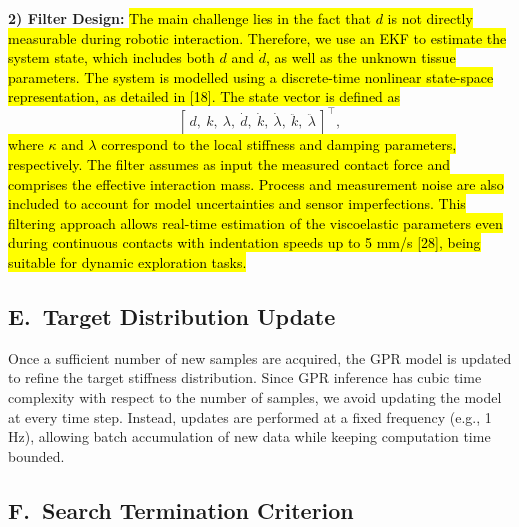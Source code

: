 \documentclass[11pt]{article}
\begin{document}
\textbf{2) Filter Design:} \hl{The main challenge lies in the fact that
$d$ is not directly measurable during robotic interaction. Therefore,
we use an EKF to estimate the system state, which includes both $d$
and $\dot{d}$, as well as the unknown tissue parameters. The system
is modelled using a discrete-time nonlinear state-space
representation, as detailed in [18]. The state vector is defined as}
\[
[\,d,\ k,\ \lambda,\ \dot{d},\ \dot{k},\ \dot{\lambda},\ \ddot{k},\
\ddot{\lambda}\,]^{\top},
\]
\hl{where $\kappa$ and $\lambda$ correspond to the local stiffness and
damping parameters, respectively. The filter assumes as input the
measured contact force and comprises the effective interaction mass.
Process and measurement noise are also included to account for model
uncertainties and sensor imperfections. This filtering approach
allows real-time estimation of the viscoelastic parameters even
during continuous contacts with indentation speeds up to 5 mm/s
[28], being suitable for dynamic exploration tasks.}

\subsection*{E.\ Target Distribution Update}

Once a sufficient number of new samples are acquired, the GPR model
is updated to refine the target stiffness distribution. Since GPR
inference has cubic time complexity with respect to the number of
samples, we avoid updating the model at every time step. Instead,
updates are performed at a fixed frequency (e.g., 1 Hz), allowing
batch accumulation of new data while keeping computation time
bounded.

\subsection*{F.\ Search Termination Criterion}
\end{document}
